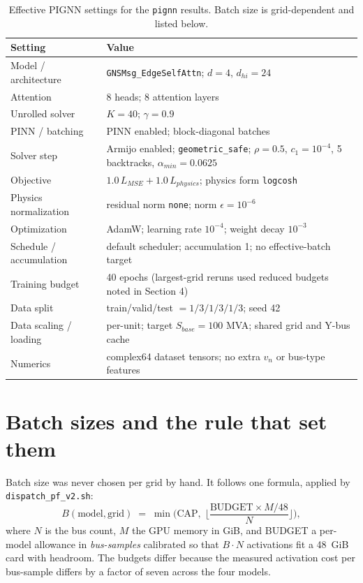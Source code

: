 \documentclass[10pt]{article}
\begin{document}
\begin{table}[H]
\centering\small
\begin{tabular}{ll}
\toprule
Setting & Value \\
\midrule
Model / architecture & \texttt{GNSMsg\_EdgeSelfAttn}; $d=4$, $d_{hi}=24$ \\
Attention & 8 heads; 8 attention layers \\
Unrolled solver & $K=40$; $\gamma=0.9$ \\
PINN / batching & PINN enabled; block-diagonal batches \\
Solver step & Armijo enabled; \texttt{geometric\_safe}; $\rho=0.5$, $c_1=10^{-4}$, 5 backtracks, $\alpha_{min}=0.0625$ \\
Objective & $1.0\,L_{MSE}+1.0\,L_{physics}$; physics form \texttt{logcosh} \\
Physics normalization & residual norm \texttt{none}; norm $\epsilon=10^{-6}$ \\
Optimization & AdamW; learning rate $10^{-4}$; weight decay $10^{-3}$ \\
Schedule / accumulation & default scheduler; accumulation 1; no effective-batch target \\
Training budget & 40 epochs (largest-grid reruns used reduced budgets noted in Section 4) \\
Data split & train/valid/test $=1/3/1/3/1/3$; seed 42 \\
Data scaling / loading & per-unit; target $S_{base}=100$ MVA; shared grid and Y-bus cache \\
Numerics & complex64 dataset tensors; no extra $v_n$ or bus-type features \\
\bottomrule
\end{tabular}
\caption{Effective PIGNN settings for the \texttt{pignn} results. Batch size is grid-dependent and listed below.}
\end{table}

\section{Batch sizes and the rule that set them}

Batch size was never chosen per grid by hand. It follows one formula, applied
by \texttt{dispatch\_pf\_v2.sh}:
\[
B(\text{model},\text{grid})
  \;=\;\min\!\Big(\text{CAP},\;
  \Big\lfloor \frac{\text{BUDGET}\times M/48}{N}\Big\rfloor\Big),
\]
where $N$ is the bus count, $M$ the GPU memory in GiB, and BUDGET a per-model
allowance in \emph{bus-samples} calibrated so that $B\cdot N$ activations fit a
48~GiB card with headroom. The budgets differ because the measured activation
cost per bus-sample differs by a factor of seven across the four models.
\end{document}
